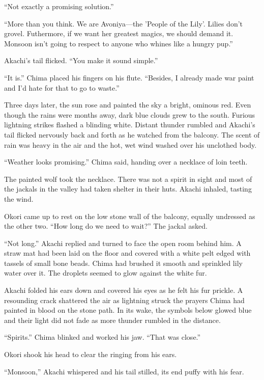``Not exactly a promising solution.''

``More than you think. We are Avoniya---the 'People of the Lily'. Lilies don't grovel. Futhermore, if we want her greatest magics, we should demand it. Monsoon isn't going to respect to anyone who whines like a hungry pup.''

Akachi's tail flicked. ``You make it sound simple.''

``It is.'' Chima placed his fingers on his flute. ``Besides, I already made war paint and I'd hate for that to go to waste.''

\secdiv

\noindent Three days later, the sun rose and painted the sky a bright, ominous red. Even though the rains were months away, dark blue clouds grew to the south. Furious lightning strikes flashed a blinding white. Distant thunder rumbled and Akachi's tail flicked nervously back and forth as he watched from the balcony. The scent of rain was heavy in the air and the hot, wet wind washed over his unclothed body.

``Weather looks promising.'' Chima said, handing over a necklace of loin teeth.

The painted wolf took the necklace. There was not a spirit in sight and most of the jackals in the valley had taken shelter in their huts. Akachi inhaled, tasting the wind.

Okori came up to rest on the low stone wall of the balcony, equally undressed as the other two. ``How long do we need to wait?'' The jackal asked.

``Not long.'' Akachi replied and turned to face the open room behind him. A straw mat had been laid on the floor and covered with a white pelt edged with tassels of small bone beads. Chima had brushed it smooth and sprinkled lily water over it. The droplets seemed to glow against the white fur.

Akachi folded his ears down and covered his eyes as he felt his fur prickle. A resounding crack shattered the air as lightning struck the prayers Chima had painted in blood on the stone path. In its wake, the symbols below glowed blue and their light did not fade as more thunder rumbled in the distance.

``Spirits.'' Chima blinked and worked his jaw. ``That was close.''

Okori shook his head to clear the ringing from his ears.

``Monsoon,'' Akachi whispered and his tail stilled, its end puffy with his fear.

